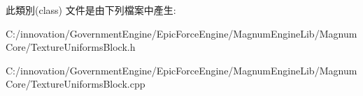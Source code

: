 此類別(class) 文件是由下列檔案中產生\+:\begin{DoxyCompactItemize}
\item 
C\+:/innovation/\+Government\+Engine/\+Epic\+Force\+Engine/\+Magnum\+Engine\+Lib/\+Magnum\+Core/Texture\+Uniforms\+Block.\+h\item 
C\+:/innovation/\+Government\+Engine/\+Epic\+Force\+Engine/\+Magnum\+Engine\+Lib/\+Magnum\+Core/Texture\+Uniforms\+Block.\+cpp\end{DoxyCompactItemize}
